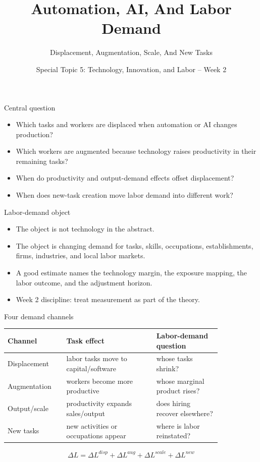 \documentclass[aspectratio=169,11pt]{beamer}
\title{Automation, AI, And Labor Demand}
\subtitle{Displacement, Augmentation, Scale, And New Tasks}
\author{Special Topic 5: Technology, Innovation, and Labor -- Week 2}
\date{}
\begin{document}
\begin{frame}
  \titlepage
\end{frame}

\begin{frame}{Central question}
\begin{itemize}
    \item Which tasks and workers are displaced when automation or AI changes production?
    \item Which workers are augmented because technology raises productivity in their remaining tasks?
    \item When do productivity and output-demand effects offset displacement?
    \item When does new-task creation move labor demand into different work?
\end{itemize}
\end{frame}

\begin{frame}{Labor-demand object}
\begin{itemize}
    \item The object is not technology in the abstract.
    \item The object is changing demand for tasks, skills, occupations, establishments, firms, industries, and local labor markets.
    \item A good estimate names the technology margin, the exposure mapping, the labor outcome, and the adjustment horizon.
    \item Week 2 discipline: treat measurement as part of the theory.
\end{itemize}
\end{frame}

\begin{frame}{Four demand channels}
\small
\begin{tabular}{p{0.22\linewidth} p{0.36\linewidth} p{0.26\linewidth}}
\toprule
Channel & Task effect & Labor-demand question \\
\midrule
Displacement & labor tasks move to capital/software & whose tasks shrink? \\
Augmentation & workers become more productive & whose marginal product rises? \\
Output/scale & productivity expands sales/output & does hiring recover elsewhere? \\
New tasks & new activities or occupations appear & where is labor reinstated? \\
\bottomrule
\end{tabular}
\vspace{0.35cm}
\[
\Delta L =
\Delta L^{disp} + \Delta L^{aug} + \Delta L^{scale} + \Delta L^{new}
\]
\end{frame}
\end{document}
